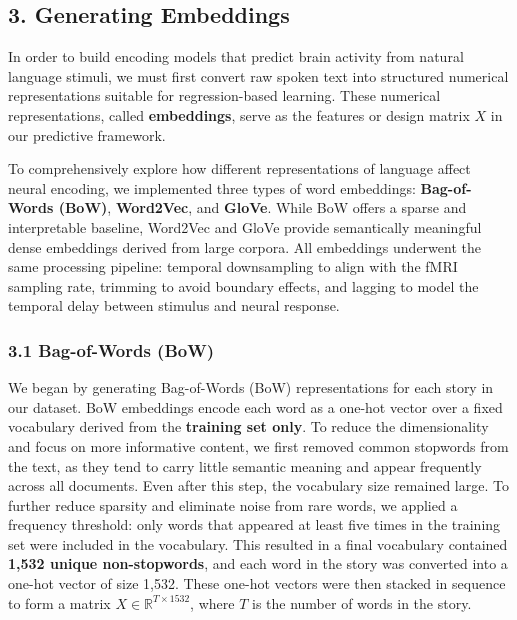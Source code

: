 \documentclass[11pt]{article}
\begin{document}
    \hypertarget{generating-embeddings}{%
\subsection{3. Generating Embeddings}\label{generating-embeddings}}

In order to build encoding models that predict brain activity from
natural language stimuli, we must first convert raw spoken text into
structured numerical representations suitable for regression-based
learning. These numerical representations, called \textbf{embeddings},
serve as the features or design matrix \(X\) in our predictive
framework.

To comprehensively explore how different representations of language
affect neural encoding, we implemented three types of word embeddings:
\textbf{Bag-of-Words (BoW)}, \textbf{Word2Vec}, and \textbf{GloVe}.
While BoW offers a sparse and interpretable baseline, Word2Vec and GloVe
provide semantically meaningful dense embeddings derived from large
corpora. All embeddings underwent the same processing pipeline: temporal
downsampling to align with the fMRI sampling rate, trimming to avoid
boundary effects, and lagging to model the temporal delay between
stimulus and neural response.

\hypertarget{bag-of-words-bow}{%
\subsubsection{3.1 Bag-of-Words (BoW)}\label{bag-of-words-bow}}

We began by generating Bag-of-Words (BoW) representations for each story
in our dataset. BoW embeddings encode each word as a one-hot vector over
a fixed vocabulary derived from the \textbf{training set only}. To
reduce the dimensionality and focus on more informative content, we
first removed common stopwords from the text, as they tend to carry
little semantic meaning and appear frequently across all documents. Even
after this step, the vocabulary size remained large. To further reduce
sparsity and eliminate noise from rare words, we applied a frequency
threshold: only words that appeared at least five times in the training
set were included in the vocabulary. This resulted in a final vocabulary
contained \textbf{1,532 unique non-stopwords}, and each word in the
story was converted into a one-hot vector of size 1,532. These one-hot
vectors were then stacked in sequence to form a matrix
\(X \in \mathbb{R}^{T \times 1532}\), where \(T\) is the number of words
in the story.
\end{document}

